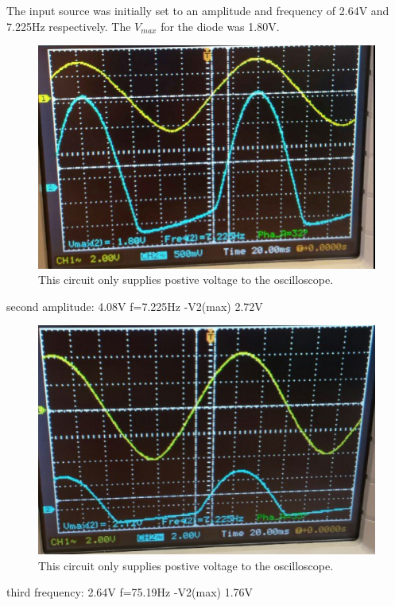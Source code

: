 \documentclass[twocolumn, amsmath]{revtex4}
\begin{document}
The input source was initially set to an amplitude and frequency of 2.64V and 7.225Hz respectively. The $V_{max}$ for the diode was 1.80V.

\begin{figure}
    \includegraphics[scale=0.3]{1800mV.png}  
    \caption{This circuit only supplies postive voltage to the oscilloscope.}
\end{figure}


second amplitude: 4.08V f=7.225Hz
-V2(max) 2.72V

\begin{figure}
    \includegraphics[scale=0.3]{2720mV.png}  
    \caption{This circuit only supplies postive voltage to the oscilloscope.}
\end{figure}


third frequency: 2.64V f=75.19Hz
-V2(max) 1.76V
\end{document}
